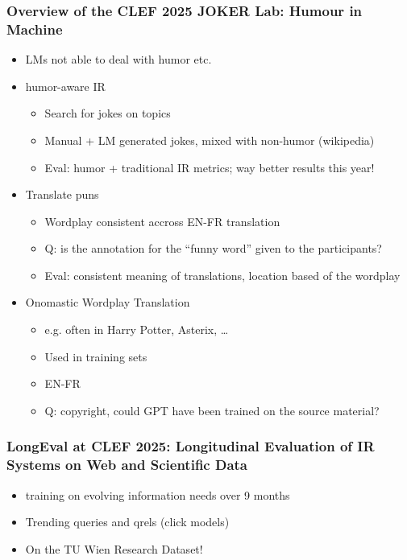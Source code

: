 \documentclass[a4paper]{article}
\begin{document}
\subsubsection{Overview of the CLEF 2025 JOKER Lab: Humour in Machine}
\begin{itemize}
    \item LMs not able to deal with humor etc.
    \item humor-aware IR
          \begin{itemize}
              \item Search for jokes on topics
              \item Manual + LM generated jokes, mixed with non-humor (wikipedia)
              \item Eval: humor + traditional IR metrics; way better results this year!
          \end{itemize}
    \item Translate puns
          \begin{itemize}
              \item Wordplay consistent accross EN-FR translation
              \item Q: is the annotation for the \enquote{funny word} given to the participants?
              \item Eval: consistent meaning of translations, location based of the wordplay
          \end{itemize}
    \item Onomastic Wordplay Translation
          \begin{itemize}
              \item e.g. often in Harry Potter, Asterix, \dots
              \item Used in training sets
              \item EN-FR
              \item Q: copyright, could GPT have been trained on the source material?
          \end{itemize}
\end{itemize}
\subsubsection{LongEval at CLEF 2025: Longitudinal Evaluation of IR Systems on Web and Scientific Data}
\begin{itemize}
    \item training on evolving information needs over 9 months
    \item Trending queries and qrels (click models)
    \item On the TU Wien Research Dataset!
\end{itemize}
\end{document}
